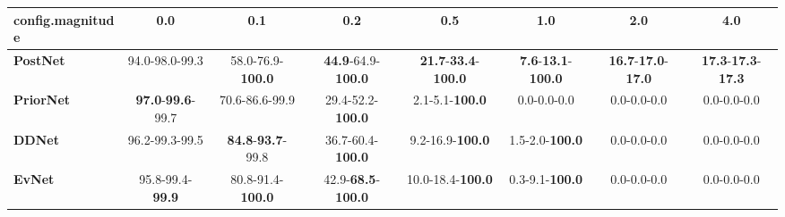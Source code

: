 \begin{tabular}{lccccccc}
\toprule
\textbf{config.magnitude} &                               0.0 &                               0.1 &                                0.2 &                                         0.5 &                                        1.0 &                                        2.0 &                                        4.0 \\
\midrule
\textbf{PostNet } &                    94.0-98.0-99.3 &          58.0-76.9-\textbf{100.0} &  \textbf{44.9}-64.9-\textbf{100.0} &  \textbf{21.7}-\textbf{33.4}-\textbf{100.0} &  \textbf{7.6}-\textbf{13.1}-\textbf{100.0} &  \textbf{16.7}-\textbf{17.0}-\textbf{17.0} &  \textbf{17.3}-\textbf{17.3}-\textbf{17.3} \\
\textbf{PriorNet} &  \textbf{97.0}-\textbf{99.6}-99.7 &                    70.6-86.6-99.9 &           29.4-52.2-\textbf{100.0} &                      2.1-5.1-\textbf{100.0} &                                0.0-0.0-0.0 &                                0.0-0.0-0.0 &                                0.0-0.0-0.0 \\
\textbf{DDNet   } &                    96.2-99.3-99.5 &  \textbf{84.8}-\textbf{93.7}-99.8 &           36.7-60.4-\textbf{100.0} &                     9.2-16.9-\textbf{100.0} &                     1.5-2.0-\textbf{100.0} &                                0.0-0.0-0.0 &                                0.0-0.0-0.0 \\
\textbf{EvNet   } &           95.8-99.4-\textbf{99.9} &          80.8-91.4-\textbf{100.0} &  42.9-\textbf{68.5}-\textbf{100.0} &                    10.0-18.4-\textbf{100.0} &                     0.3-9.1-\textbf{100.0} &                                0.0-0.0-0.0 &                                0.0-0.0-0.0 \\
\bottomrule
\end{tabular}

